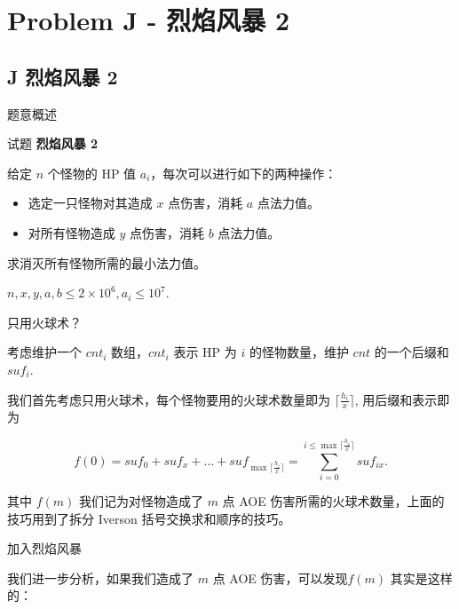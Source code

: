 \documentclass{beamer}
\newcommand{\TT}[1] {{\ttfamily #1}}
\newcommand{\BF}[1] {\textbf{#1}}
\begin{document}


{

\section[J]{Problem J - 烈焰风暴 2}
\subsection{J 烈焰风暴 2}





\begin{frame}{题意概述}

\begin{center}
试题 \myboxx{      \BF{\TT{J}}} \BF{烈焰风暴 2}
\end{center}

给定 $n$ 个怪物的 HP 值 $a_i$，每次可以进行如下的两种操作：

\begin{itemize}
  \item 选定一只怪物对其造成 $x$ 点伤害，消耗 $a$ 点法力值。
  \item 对所有怪物造成 $y$ 点伤害，消耗 $b$ 点法力值。
\end{itemize}

求消灭所有怪物所需的最小法力值。

$n, x, y, a, b \le 2 \times 10^6, a_i \le 10^7$.

\end{frame}


\begin{frame}{只用火球术？}

考虑维护一个 $cnt_i$ 数组，$cnt_i$ 表示 HP 为 $i$ 的怪物数量，维护 $cnt$ 的一个后缀和 $suf_i$.

我们首先考虑只用火球术，每个怪物要用的火球术数量即为 $\lceil\frac{h_i}{x}\rceil$, 用后缀和表示即为

\[
  f(0) = suf_{0} + suf_{x} + \ldots + suf_{\max\lceil\frac{h_i}{x}\rceil} = \sum_{i = 0}^{i \le \max \lceil\frac{h_i}{x}\rceil} suf_{ix}.
\]

其中 $f(m)$ 我们记为对怪物造成了 $m$ 点 AOE 伤害所需的火球术数量，上面的技巧用到了拆分 Iverson 括号交换求和顺序的技巧。


\end{frame}

\begin{frame}{加入烈焰风暴}

我们进一步分析，如果我们造成了 $m$ 点 AOE 伤害，可以发现$f(m)$ 其实是这样的：


\end{frame}}
\end{document}
